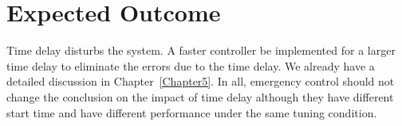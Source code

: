 \section{Expected Outcome} %
Time delay disturbs the system. A faster controller be implemented for a larger time delay to eliminate the errors due to the time delay. We already have a detailed discussion in Chapter~\ref{Chapter5}. In all, emergency control should not change the conclusion on the impact of time delay although they have different start time and have different performance under the same tuning condition.\\